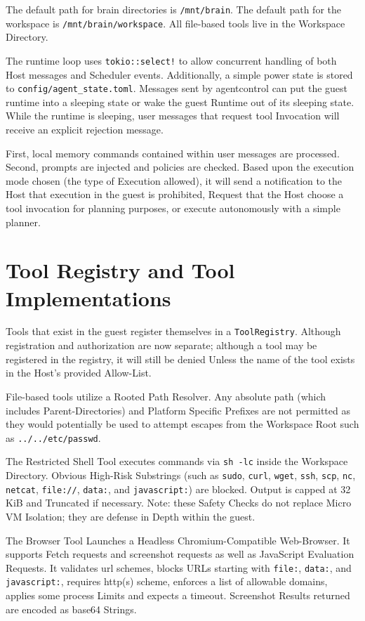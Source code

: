 The default path for brain directories is \texttt{/mnt/brain}. The default path
for the workspace is \texttt{/mnt/brain/workspace}. All file-based tools live in
the Workspace Directory.

The runtime loop uses \texttt{tokio::select!} to allow concurrent handling of
both Host messages and Scheduler events. Additionally, a simple power state is
stored to \texttt{config/agent\_state.toml}. Messages sent by agentcontrol can put
the guest runtime into a sleeping state or wake the guest Runtime out of its
sleeping state. While the runtime is sleeping, user messages that request tool
Invocation will receive an explicit rejection message.

First, local memory commands contained within user messages are processed.
Second, prompts are injected and policies are checked. Based upon the execution
mode chosen (the type of Execution allowed), it will send a notification to the
Host that execution in the guest is prohibited, Request that the Host choose a
tool invocation for planning purposes, or execute autonomously with a simple
planner.

\section{Tool Registry and Tool Implementations}
Tools that exist in the guest register themselves in a \texttt{ToolRegistry}.
Although registration and authorization are now separate; although a tool may be
registered in the registry, it will still be denied Unless the name of the tool
exists in the Host's provided Allow-List.

File-based tools utilize a Rooted Path Resolver. Any absolute path (which includes
Parent-Directories) and Platform Specific Prefixes are not permitted as they
would potentially be used to attempt escapes from the Workspace Root such as
\texttt{../../etc/passwd}.

The Restricted Shell Tool executes commands via \texttt{sh -lc} inside the
Workspace Directory. Obvious High-Risk Substrings (such as \texttt{sudo},
\texttt{curl}, \texttt{wget}, \texttt{ssh}, \texttt{scp}, \texttt{nc},
\texttt{netcat}, \texttt{file://}, \texttt{data:}, and \texttt{javascript:}) are
blocked. Output is capped at 32 KiB and Truncated if necessary. Note: these
Safety Checks do not replace Micro VM Isolation; they are defense in Depth
within the guest.

The Browser Tool Launches a Headless Chromium-Compatible Web-Browser. It supports
Fetch requests and screenshot requests as well as JavaScript Evaluation
Requests. It validates url schemes, blocks URLs starting with \texttt{file:},
\texttt{data:}, and \texttt{javascript:}, requires http(s) scheme, enforces a
list of allowable domains, applies some process Limits and expects a timeout.
Screenshot Results returned are encoded as base64 Strings.

